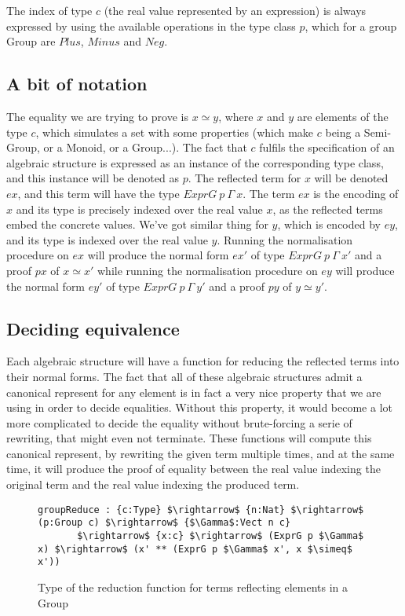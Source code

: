 The index of type $c$ (the real value represented by an expression) is always expressed by using the available operations in the type class $p$, which for a group Group are $Plus$, $Minus$ and $Neg$.

	\subsection {A bit of notation}
The equality we are trying to prove is $x \simeq y$, where $x$ and $y$ are elements of the type $c$, which  simulates a set with some properties (which make $c$ being a Semi-Group, or a Monoid, or a Group...). The fact that $c$ fulfils the specification of an algebraic structure is expressed as an instance of the corresponding type class, and this instance will be denoted as $p$.
The reflected term for $x$ will be denoted $ex$, and this term will have the type $ExprG\ p\ \Gamma\ x$. The term $ex$ is the encoding of $x$ and its type is precisely indexed over the real value $x$, as the reflected terms embed the concrete values.
We've got similar thing for $y$, which is encoded by $ey$, and its type is indexed over the real value $y$.
Running the normalisation procedure on $ex$ will produce the normal form $ex'$ of type $ExprG\ p\ \Gamma\ x'$ and a proof $px$ of $x \simeq x'$ while running the normalisation procedure on $ey$ will produce the normal form $ey'$ of type $ExprG\ p\ \Gamma\ y'$ and a proof $py$ of $y \simeq y'$.

	\subsection {Deciding equivalence}
	
Each algebraic structure will have a function for reducing the reflected terms into their normal forms. The fact that all of these algebraic structures admit a canonical represent for any element is in fact a very nice property that we are using in order to decide equalities. Without this property, it would become a lot more complicated to decide the equality without brute-forcing a serie of rewriting, that might even not terminate.
These functions will compute this canonical represent, by rewriting the given term multiple times, and at the same time, it will produce the proof of equality between the real value indexing the original term and the real value indexing the produced term.

\begin{figure}[H]
\figrule
\begin{center}
\begin{lstlisting}
groupReduce : {c:Type} $\rightarrow$ {n:Nat} $\rightarrow$ (p:Group c) $\rightarrow$ {$\Gamma$:Vect n c} 
	   $\rightarrow$ {x:c} $\rightarrow$ (ExprG p $\Gamma$ x) $\rightarrow$ (x' ** (ExprG p $\Gamma$ x', x $\simeq$ x'))
\end{lstlisting}
\end{center}
\caption{Type of the reduction function for terms reflecting elements in a Group}
\figrule
\end{figure}

